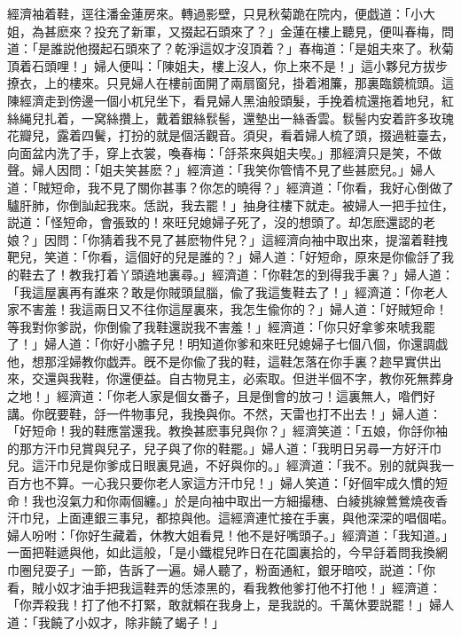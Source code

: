 經濟袖着鞋，逕往潘金蓮房來。轉過影壁，只見秋菊跪在院内，便戯道：「小大姐，為甚麽來？投充了新軍，又掇起石頭來了？」金蓮在樓上聽見，便叫春梅，問道：「是誰説他掇起石頭來了？乾淨這奴才沒頂着？」春梅道：「是姐夫來了。秋菊頂着石頭哩！」婦人便叫：「陳姐夫，樓上沒人，你上來不是！」這小夥兒方拔步撩衣，上的樓來。只見婦人在樓前面開了兩扇窗兒，掛着湘簾，那裏臨鏡梳頭。這陳經濟走到傍邊一個小杌兒坐下，看見婦人黑油般頭髮，手挽着梳還拖着地兒，紅絲䋲兒扎着，一窝絲攢上，戴着銀絲䯼髻，還墊出一絲香雲。䯼髻内安着許多玫瑰花瓣兒，露着四鬢，打扮的就是個活觀音。須臾，看着婦人梳了頭，掇過粧臺去，向面盆内洗了手，穿上衣裳，喚春梅：「㧱茶來與姐夫喫。」那經濟只是笑，不做聲。婦人因問：「姐夫笑甚麽？」經濟道：「我笑你管情不見了些甚麽兒。」婦人道：「賊短命，我不見了關你甚事？你怎的曉得？」經濟道：「你看，我好心倒做了驢肝肺，你倒訕起我來。恁説，我去罷！」抽身往樓下就走。被婦人一把手拉住，説道：「怪短命，會張致的！來旺兒媳婦子死了，沒的想頭了。却怎麽還認的老娘？」因問：「你猜着我不見了甚麽物件兒？」這經濟向袖中取出來，提溜着鞋拽靶兒，笑道：「你看，這個好的兒是誰的？」婦人道：「好短命，原來是你偸㧱了我的鞋去了！教我打着丫頭遶地裏尋。」經濟道：「你鞋怎的到得我手裏？」婦人道：「我這屋裏再有誰來？敢是你賊頭鼠腦，偸了我這隻鞋去了！」經濟道：「你老人家不害羞！我這兩日又不往你這屋裏來，我怎生偸你的？」婦人道：「好賊短命！等我對你爹説，你倒偸了我鞋還説我不害羞！」經濟道：「你只好拿爹來唬我罷了！」婦人道：「你好小膽子兒！明知道你爹和來旺兒媳婦子七個八個，你還調戯他，想那淫婦教你戯弄。旣不是你偸了我的鞋，這鞋怎落在你手裏？趂早實供出來，交還與我鞋，你還便益。自古物見主，必索取。但迸半個不字，教你死無葬身之地！」經濟道：「你老人家是個女番子，且是倒會的放刁！這裏無人，喒們好講。你旣要鞋，㧱一件物事兒，我換與你。不然，天雷也打不出去！」婦人道：「好短命！我的鞋應當還我。教換甚麽事兒與你？」經濟笑道：「五娘，你㧱你袖的那方汗巾兒賞與兒子，兒子與了你的鞋罷。」婦人道：「我明日另尋一方好汗巾兒。這汗巾兒是你爹成日眼裏見過，不好與你的。」經濟道：「我不。别的就與我一百方也不算。一心我只要你老人家這方汗巾兒！」婦人笑道：「好個牢成久慣的短命！我也沒氣力和你兩個纏。」於是向袖中取出一方細撮穗、白綾挑線鶯鶯燒夜香汗巾兒，上面連銀三事兒，都掠與他。這經濟連忙接在手裏，與他深深的唱個喏。婦人吩咐：「你好生藏着，休教大姐看見！他不是好嘴頭子。」經濟道：「我知道。」一面把鞋遞與他，如此這般，「是小鐵棍兒昨日在花園裏拾的，今早㧱着問我換網巾圈兒耍子」一節，告訴了一遍。婦人聽了，粉面通紅，銀牙暗咬，説道：「你看，賊小奴才油手把我這鞋弄的恁漆黑的，看我教他爹打他不打他！」經濟道：「你弄殺我！打了他不打緊，敢就賴在我身上，是我説的。千萬休要説罷！」婦人道：「我饒了小奴才，除非饒了蝎子！」

